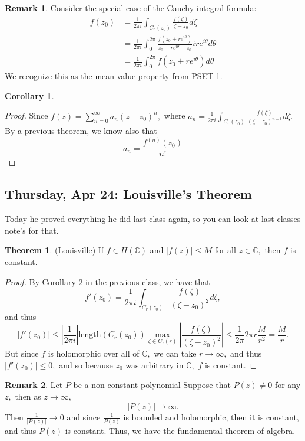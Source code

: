 \documentclass[10pt, oneside]{article}
\newcommand{\bbC}{\mathbb{C}}
\theoremstyle{definition}
\newtheorem{thm}{Theorem}
\newtheorem{rem}{Remark}
\newtheorem{cor}{Corollary}
\newcommand{\bbC}{\mathbb{C}}
\begin{document}
\begin{rem}
    Consider the special case of the Cauchy integral formula:
    \begin{align*}
    f(z_0) &= \frac{1}{2\pi i}\int_{C_r(z_0)} \frac{f(\zeta)}{\zeta - z_0}d\zeta\\
    &= \frac{1}{2\pi i} \int_0^{2\pi} \frac{f(z_0 + re^{i\theta})}{z_0 + re^{i\theta} - z_0}ir e^{i \theta}d\theta\\
    &= \frac{1}{2\pi i} \int_0^{2\pi} f(z_0 + re^{i\theta})d\theta
    \end{align*}
    We recognize this as the mean value property from PSET 1.
\end{rem}

\begin{cor}
    
\end{cor}
\begin{proof}
    Since $f(z) = \sum_{n=0}^\infty a_n(z - z_0)^n,$ where $a_n = \frac{1}{2\pi i} \int_{C_r(z_0)} \frac{f(\zeta)}{(\zeta - z_0)^{n+1}}d\zeta.$ By a previous theorem, we know also that 
    \[a_n = \frac{f^{(n)}(z_0)}{n!}\]
\end{proof}

\newpage
\subsection{Thursday, Apr 24: Louisville's Theorem}

Today he proved everything he did last class again, so you can look at last classes note's for that. 
\begin{thm}
    (Louisville) If $f \in H(\bbC)$ and $|f(z)| \leq M$ for all $z\in \bbC,$ then $f$ is constant.
\end{thm}
\begin{proof}
By Corollary $2$ in the previous class, we have that 
\[f'(z_0) = \frac{1}{2\pi i} \int_{C_r(z_0)}\frac{f(\zeta)}{(\zeta - z_0)^2}d\zeta,\] and thus 
\[|f'(z_0)| \leq  |\frac{1}{2\pi i}|\text{length}(C_r(z_0)) \max_{\zeta \in C_z(r)} \left|\frac{f(\zeta)}{(\zeta - z_0)^2}\right| \leq \frac{1}{2\pi }2\pi r  \frac{M}{r^2} = \frac{M}{r }.\] But since $f$ is holomorphic over all of $\bbC,$ we can take $r \to \infty,$ and thus $|f'(z_0)| \leq 0,$ and so because $z_0$ was arbitrary in $\bbC,$ $f$ is constant.
\end{proof}

\begin{rem}
    Let $P$ be a non-constant polynomial Suppose that $P(z) \neq 0$ for any $z,$ then as $z\to \infty,$ 
    \[|P(z)| \to \infty.\] Then $\frac{1}{|P(z)|} \to 0$ and since $\frac{1}{P(z)}$ is bounded and holomorphic, then it is constant, and thus $P(z)$ is constant. Thus, we have the fundamental theorem of algebra.
\end{rem}
\end{document}
